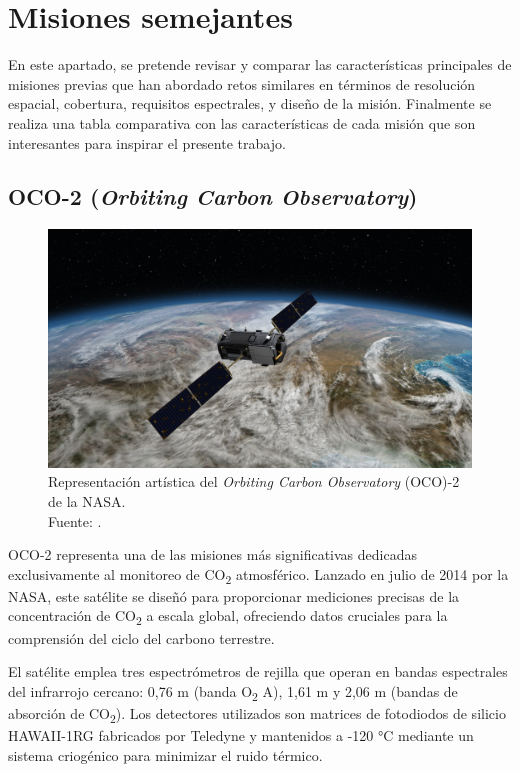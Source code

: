 \newpage
\chapter{Misiones semejantes}\label{semejantes}
\minitoc

En este apartado, se pretende revisar y comparar las características principales de misiones previas que han abordado retos similares en términos de resolución espacial, cobertura, requisitos espectrales, y diseño de la misión. Finalmente se realiza una tabla comparativa con las características de cada misión que son interesantes para inspirar el presente trabajo.

\newpage

\section{OCO-2 (\textit{Orbiting Carbon Observatory})}

\begin{figure}[h]
    \centering
    \includegraphics[width=0.9\linewidth]{2.Misiones_Semejantes/OCO2.jpg}
    \caption{Representación artística del \textit{Orbiting Carbon Observatory }(OCO)-2 de la NASA. \\Fuente: \cite{nasa_jpl_oco2_artist_concept_2014}.
}
\end{figure}

OCO-2 representa una de las misiones más significativas dedicadas exclusivamente al monitoreo de CO\textsubscript{2} atmosférico. Lanzado en julio de 2014 por la NASA, este satélite se diseñó para proporcionar mediciones precisas de la concentración de CO\textsubscript{2} a escala global, ofreciendo datos cruciales para la comprensión del ciclo del carbono terrestre.

El satélite emplea tres espectrómetros de rejilla que operan en bandas espectrales del infrarrojo cercano: 0,76 \textmu m (banda O\textsubscript{2} A), 1,61 \textmu m y 2,06 \textmu m (bandas de absorción de CO\textsubscript{2}). Los detectores utilizados son matrices de fotodiodos de silicio HAWAII-1RG fabricados por Teledyne y  mantenidos a -120 °C mediante un sistema criogénico para minimizar el ruido térmico.

